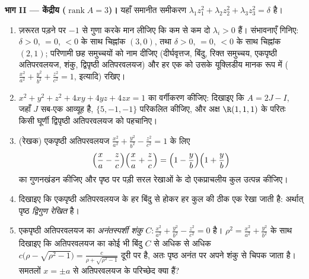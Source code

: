 \begin{problem}[{सप्ताहांत समस्या --- हर द्विघातज पृष्ठ,
वर्णक्रमीय प्रमेय से छाँटा हुआ}]
\medskip
\noindent\textbf{भाग II --- केंद्रीय 
($\operatorname{rank}A = 3$)।} यहाँ समानीत समीकरण $\lambda_1z_1^2 + \lambda_2z_2^2 + \lambda_3z_3^2 = \delta$ है।
\begin{enumerate}[resume]
  \item ज़रूरत पड़ने पर $-1$ से गुणा करके मान लीजिए कि कम से कम
        दो $\lambda_i > 0$ हैं। संभावनाएँ गिनिए: $\delta > 0$, $= 0$, $< 0$ के साथ
        चिह्नांक $(3, 0)$, तथा $\delta > 0$, $= 0$, $<
        0$ के साथ चिह्नांक $(2, 1)$;
        परिणामी छह समुच्चयों को नाम दीजिए (दीर्घवृत्तज, बिंदु,
        रिक्त समुच्चय, एकपृष्ठी अतिपरवलयज, शंकु, द्विपृष्ठी
        अतिपरवलयज) और हर एक को उसके यूक्लिडीय मानक रूप में
        ($\frac{x^2}{a^2} + \frac{y^2}{b^2} +
        \frac{z^2}{c^2} = 1$, इत्यादि) रखिए।
  \item $x^2 + y^2 + z^2 + 4xy + 4yz + 4zx = 1$ का वर्गीकरण कीजिए: दिखाइए कि $A = 2J - I$, जहाँ $J$
        सब-एक आव्यूह है,  $\{5, -1, -1\}$ परिकलित कीजिए, और
        अक्ष $\R(1,1,1)$ के परितः किसी घूर्णी द्विपृष्ठी अतिपरवलयज
        को पहचानिए।
  \item (रेखक) एकपृष्ठी अतिपरवलयज $\frac{x^2}{a^2} + \frac{y^2}{b^2} - \frac{z^2}{c^2}
        = 1$ के लिए
        \[
        \Bigl(\frac xa - \frac zc\Bigr)
        \Bigl(\frac xa + \frac zc\Bigr)
        = \Bigl(1 - \frac yb\Bigr)\Bigl(1 + \frac yb\Bigr)
        \]
        का गुणनखंडन कीजिए और पृष्ठ पर पड़ी सरल रेखाओं के दो
        एकप्राचलीय कुल उत्पन्न कीजिए।
  \item दिखाइए कि एकपृष्ठी अतिपरवलयज के हर बिंदु से होकर हर
        कुल की ठीक एक रेखा जाती है: अर्थात् पृष्ठ \emph{द्विगुण
        रेखित} है।
  \item एकपृष्ठी अतिपरवलयज का \emph{अनंतस्पर्शी शंकु} $C : \frac{x^2}{a^2} + \frac{y^2}{b^2}
        - \frac{z^2}{c^2} = 0$
        है। $\rho^2 = \frac{x^2}{a^2}
        + \frac{y^2}{b^2}$ के साथ दिखाइए कि अतिपरवलयज का कोई भी बिंदु
        $C$ से अधिक से अधिक $c\bigl(\rho -
        \sqrt{\rho^2 - 1}\bigr) = \frac{c}{\rho +
        \sqrt{\rho^2 - 1}}$ दूरी पर है, अतः पृष्ठ
        अनंत पर अपने शंकु से चिपक जाता है। समतलों $x = \pm a$ से
        अतिपरवलयज के परिच्छेद क्या हैं?
\end{enumerate}


\end{problem}
